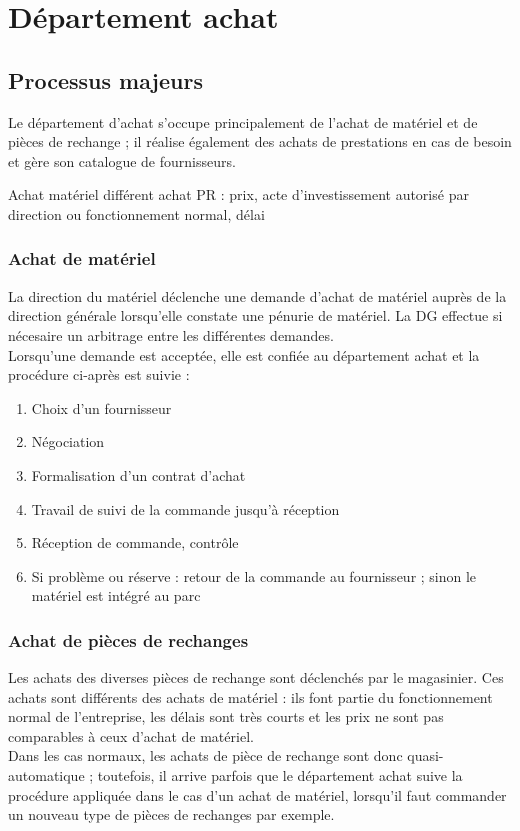 \section{Département achat}


\subsection{Processus majeurs}

Le département d'achat s'occupe principalement de l'achat de matériel et de
pièces de rechange ; il réalise également des achats de prestations en cas
de besoin et gère son catalogue de fournisseurs.

Achat matériel différent achat PR : prix, acte d'investissement autorisé
par direction ou fonctionnement normal, délai


\subsubsection{Achat de matériel}

La direction du matériel déclenche une demande d'achat de matériel auprès
de la direction générale lorsqu'elle constate une pénurie de matériel. La
DG effectue si nécesaire un arbitrage entre les différentes demandes.\\
Lorsqu'une demande est acceptée, elle est confiée au département achat et
la procédure ci-après est suivie :

\begin{enumerate}
\item Choix d'un fournisseur
\item Négociation
\item Formalisation d'un contrat d'achat
\item Travail de suivi de la commande jusqu'à réception
\item Réception de commande, contrôle
\item Si problème ou réserve : retour de la commande au fournisseur ; sinon
le matériel est intégré au parc
\end{enumerate}


\subsubsection{Achat de pièces de rechanges}

Les achats des diverses pièces de rechange sont déclenchés par le magasinier.
Ces achats sont différents des achats de matériel : ils font partie du
fonctionnement normal de l'entreprise, les délais sont très courts et les
prix ne sont pas comparables à ceux d'achat de matériel.\\
Dans les cas normaux, les achats de pièce de rechange sont donc
quasi-automatique ; toutefois, il arrive parfois que le département achat
suive la procédure appliquée dans le cas d'un achat de matériel, lorsqu'il
faut commander un nouveau type de pièces de rechanges par exemple.


